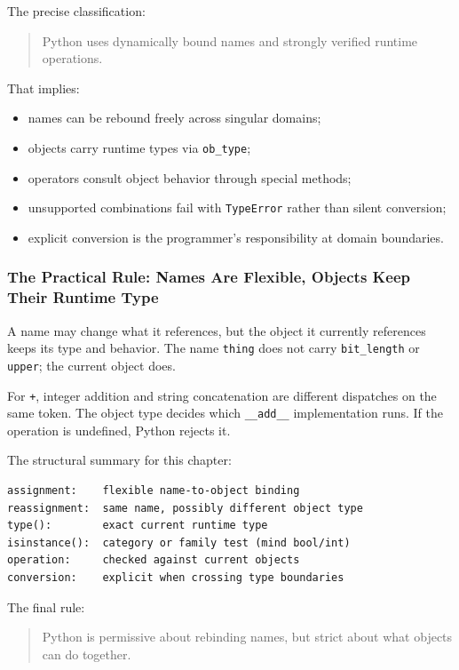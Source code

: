 \documentclass[a4paper,twoside]{report}
\begin{document}
The precise classification:

\begin{quote}
Python uses dynamically bound names and strongly verified runtime operations.
\end{quote}

That implies:

\begin{itemize}
    \item names can be rebound freely across singular domains;
    \item objects carry runtime types via \texttt{ob\_type};
    \item operators consult object behavior through special methods;
    \item unsupported combinations fail with \texttt{TypeError} rather than silent conversion;
    \item explicit conversion is the programmer's responsibility at domain boundaries.
\end{itemize}

\subsubsection{The Practical Rule: Names Are Flexible, Objects Keep Their Runtime Type}

A name may change what it references, but the object it currently references keeps its type and behavior. The name \texttt{thing} does not carry \texttt{bit\_length} or \texttt{upper}; the current object does.

For \texttt{+}, integer addition and string concatenation are different dispatches on the same token. The object type decides which \texttt{\_\_add\_\_} implementation runs. If the operation is undefined, Python rejects it.

The structural summary for this chapter:

\begin{verbatim}
assignment:    flexible name-to-object binding
reassignment:  same name, possibly different object type
type():        exact current runtime type
isinstance():  category or family test (mind bool/int)
operation:     checked against current objects
conversion:    explicit when crossing type boundaries
\end{verbatim}

The final rule:

\begin{quote}
Python is permissive about rebinding names, but strict about what objects can do together.
\end{quote}
\end{document}

